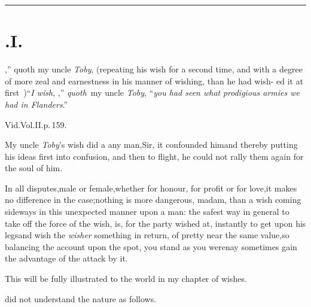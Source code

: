 \documentclass{article}
\begin{document}
\vskip 12pt
\hrule
\setlength{\baselineskip}{14pt}  %
\setcounter{page}{5}
\section{.\quad  I.}

\drslop,” quoth my\break
uncle \textit{Toby}, (repeating his\break
wish for \drslop a second time, and with\break
a degree of more zeal and earnestness in\break
his manner of wishing, than he had wish-\break
ed it at first \fnast\,)\tsh “\textit{I wish}, \drslop,”\break
\textit{quoth}\sic\ my uncle \textit{Toby}, “\textit{you had seen what}\break
\lqq\textit{prodigious armies we had in Flanders}.”

\bgroup\footnotesize
\indent\fnast\enspace Vid.\@ Vol.\@ II.\@ p.\,159.\par
\egroup
{}
\newpage
My uncle \textit{Toby}’s wish did \drslop a
 any man,\tsh Sir, it
confounded him\tsh and thereby putting his ideas first into
confusion, and then to flight, he could not rally them again for
the soul of him.

In all disputes,\tsh male or female,\tsh whether for honour, for
profit or for love,\break \tsk it makes no difference in the
case;\tsk nothing is more dangerous, madam, than a wish coming
sideways in this unexpect\-ed manner upon a man: the safest way
in general to take off the force of the wish, is, for the party
wished at, instantly to get upon his legs\tsk and wish the
\textit{wisher} something in return, of pretty near the same
value,\tsk so balancing the account upon the spot, you stand as
you were\tsk nay sometimes gain the advantage of the attack by
it.

This will be fully illustrated to the\break
world in my chapter of wishes.\tsh

\drslop did not understand the nature 
as follows.
\end{document}
